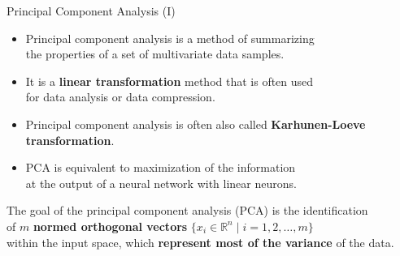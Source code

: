 \begin{frame}{Principal Component Analysis (I)}
	\begin{itemize}
		\item Principal component analysis is a method of summarizing \\
		the properties of a set of multivariate data samples.
		\item It is a \textbf{linear transformation} method that is often used 
		\\ for data analysis or data compression.
		\item Principal component analysis is often also called 
		\textbf{Karhunen-Loeve transformation}.
		\item PCA is equivalent to maximization of the information \\ at the 
		output of a neural network with linear neurons.
	\end{itemize}
	\vspace{0.5cm}
	The goal of the principal component analysis (PCA) is the identification \\
	of $m$ \textbf{normed orthogonal vectors} $\{x_i \in \mathbb{R}^n \; \vert 
	\; i = 1,2, \ldots,m \}$ \\
	within the input space, which \textbf{represent most of the variance} of 
	the data.
\end{frame}

